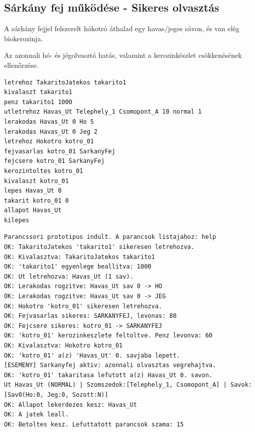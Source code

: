\subsection{Sárkány fej működése - Sikeres olvasztás}
\begin{test-case-description}
    A sárkány fejjel felszerelt hókotró áthalad egy havas/jeges sávon, és van elég biokerozinja.
\end{test-case-description}
\begin{test-case-function}
    Az azonnali hó- és jégolvasztó hatás, valamint a kerozinkészlet csökkenésének ellenőrzése.
\end{test-case-function}
\begin{test-case-input}
\begin{verbatim}
letrehoz TakaritoJatekos takarito1
kivalaszt takarito1
penz takarito1 1000
utletrehoz Havas_Ut Telephely_1 Csomopont_A 10 normal 1
lerakodas Havas_Ut 0 Ho 5
lerakodas Havas_Ut 0 Jeg 2
letrehoz Hokotro kotro_01
fejvasarlas kotro_01 SarkanyFej
fejcsere kotro_01 SarkanyFej
kerozintoltes kotro_01
kivalaszt kotro_01
lepes Havas_Ut 0
takarit kotro_01 0
allapot Havas_Ut
kilepes
\end{verbatim}
\end{test-case-input}
\begin{test-case-output}
\begin{verbatim}
Parancssori prototipus indult. A parancsok listajahoz: help
OK: TakaritoJatekos 'takarito1' sikeresen letrehozva.
OK: Kivalasztva: TakaritoJatekos takarito1
OK: 'takarito1' egyenlege beallitva: 1000
OK: Ut letrehozva: Havas_Ut (1 sav).
OK: Lerakodas rogzitve: Havas_Ut sav 0 -> HO
OK: Lerakodas rogzitve: Havas_Ut sav 0 -> JEG
OK: Hokotro 'kotro_01' sikeresen letrehozva.
OK: Fejvasarlas sikeres: SARKANYFEJ, levonas: 80
OK: Fejcsere sikeres: kotro_01 -> SARKANYFEJ
OK: 'kotro_01' kerozinkeszlete feltoltve. Penz levonva: 60
OK: Kivalasztva: Hokotro kotro_01
OK: 'kotro_01' a(z) 'Havas_Ut' 0. savjaba lepett.
[ESEMENY] Sarkanyfej aktiv: azonnali olvasztas vegrehajtva.
OK: 'kotro_01' takaritasa lefutott a(z) Havas_Ut 0. savon.
Ut Havas_Ut (NORMAL) | Szomszedok:[Telephely_1, Csomopont_A] | Savok: [Sav0(Ho:0, Jeg:0, Sozott:N)]
OK: Allapot lekerdezes kesz: Havas_Ut
OK: A jatek leall.
OK: Betoltes kesz. Lefuttatott parancsok szama: 15
\end{verbatim}
\end{test-case-output}

